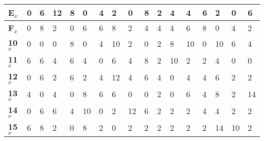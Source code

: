 \begin{longtable}[c]{|l|l|l|l|l|l|l|l|l|l|l|l|l|l|l|l|l|}
\textbf{E$_x$}  & 0              & 6              & 12             & 8              & 0              & 4              & 2              & 0              & 8              & 2              & 4              & 4              & 6              & 2              & 0              & 6              \\ \hline
\textbf{F$_x$}  & 0              & 8              & 2              & 0              & 6              & 6              & 8              & 2              & 4              & 4              & 4              & 6              & 8              & 0              & 4              & 2              \\ \hline
\textbf{10$_x$} & 0              & 0              & 0              & 8              & 0              & 4              & 10             & 2              & 0              & 2              & 8              & 10             & 0              & 10             & 6              & 4              \\ \hline
\textbf{11$_x$} & 6              & 6              & 4              & 6              & 4              & 0              & 6              & 4              & 8              & 2              & 10             & 2              & 2              & 4              & 0              & 0              \\ \hline
\textbf{12$_x$} & 0              & 6              & 2              & 6              & 2              & 4              & 12             & 4              & 6              & 4              & 0              & 4              & 4              & 6              & 2              & 2              \\ \hline
\textbf{13$_x$} & 4              & 0              & 4              & 0              & 8              & 6              & 6              & 0              & 0              & 2              & 0              & 6              & 4              & 8              & 2              & 14             \\ \hline
\textbf{14$_x$} & 0              & 6              & 6              & 4              & 10             & 0              & 2              & 12             & 6              & 2              & 2              & 2              & 4              & 4              & 2              & 2              \\ \hline
\textbf{15$_x$} & 6              & 8              & 2              & 0              & 8              & 2              & 0              & 2              & 2              & 2              & 2              & 2              & 2              & 14             & 10             & 2              \\ \hline

\end{longtable}
